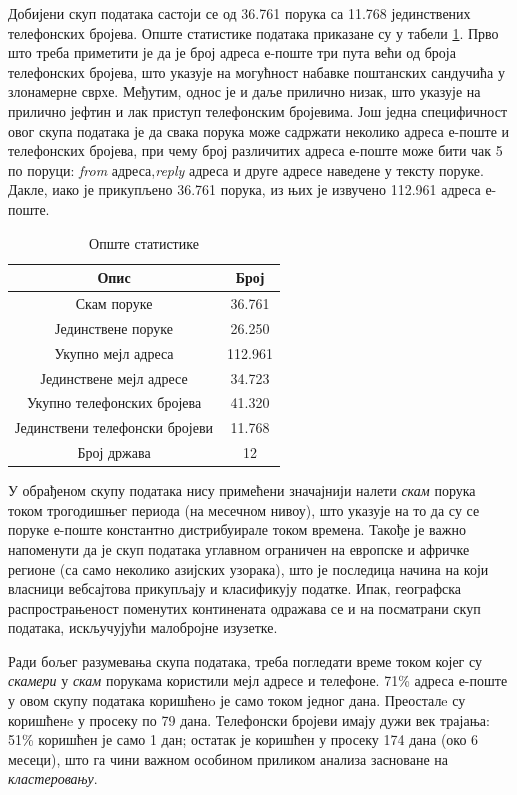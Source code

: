 \documentclass[a4paper]{article}
\begin{document}
Добијени скуп података састоји се од 36.761 порука са 11.768 јединствених телефонских бројева. Опште статистике података приказане су у табели \ref{tab:tabela}. Прво што треба приметити је да је број адреса е-поште три пута већи од броја телефонских бројева, што указује на могућност набавке поштанских сандучића у злонамерне сврхе. Међутим, однос је и даље прилично низак, што указује на прилично јефтин и лак приступ телефонским бројевима. Још једна специфичност овог скупа података је да свака порука може садржати неколико адреса е-поште и телефонских бројева, при чему број различитих адреса е-поште може бити чак 5 по поруци: \emph{from} адреса,\emph{reply} адреса и друге адресе наведене у тексту поруке. Дакле, иако је прикупљено 36.761 порука, из њих је извучено 112.961 адреса е-поште.

\begin{table}[h!]
\begin{center}
\caption{Опште статистике}
\begin{tabular}{|c|c|} \hline
\textbf{Опис} & \textbf{Број} \\ \hline
Скам поруке & 36.761 \\ \hline
Јединствене поруке & 26.250\\ \hline
Укупно мејл адреса & 112.961\\ \hline
Јединствене мејл адресе & 34.723\\ \hline
Укупно телефонских бројева & 41.320\\ \hline
Јединствени телефонски бројеви & 11.768\\ \hline
Број држава & 12\\ \hline
\end{tabular}
\label{tab:tabela}
\end{center}
\end{table}

У обрађеном скупу података нису примећени значајнији налети \emph{скам} порука током трогодишњег периода (на месечном нивоу), што указује на то да су се поруке е-поште константно дистрибуирале током времена. Такође је важно напоменути да је скуп података углавном ограничен на европске и афричке регионе (са само неколико азијских узорака), што је последица начина на који власници вебсајтова прикупљају и класификују податке. Ипак, географска распрострањеност поменутих континената одражава се и на посматрани скуп података, искључујући малобројне изузетке.

Ради бољег разумевања скупа података, треба погледати време током којег су \emph{скамери} у \emph{скам} порукама користили мејл адресе и телефоне. 71\% адреса е-поште у овом скупу података коришћенo је само током једног дана. Преосталe су коришћенe у просеку по 79 дана. Телефонски бројеви имају дужи век трајања: 51\% коришћен је само 1 дан; остатак је коришћен у просеку 174 дана (око 6 месеци), што га чини важном особином приликом анализа засноване на \emph{кластеровању}.
\end{document}
